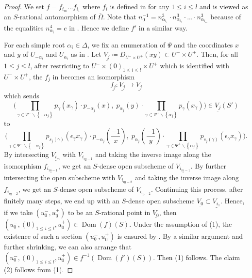 \documentclass[11pt, reqno]{amsart}
\theoremstyle{plain}
\theoremstyle{definition}
\DeclareMathOperator{\Dom}{Dom} %
\begin{document}
\begin{proof}
    We set
    $f=f_{i_m}...f_{i_1}$ where $f_i$ is defined in  for any $1\leq i\leq l$ and is viewed as an $S$-rational automorphism of $\overline{\Omega}$. 
    Note that $n_0^{-1}=n_{\alpha_{i_1}}^3\cdot n_{\alpha_{i_{2}}}^3\cdot...\cdot n_{\alpha_{i_m}}^3$ because of the equalities $n_{\alpha_i}^4=e$ in \cite[exposé~XX, théorème~3.1 (v)]{SGA3III}. Hence we define $f'$ in a similar way. 

    For each simple root $\alpha_i\in\Delta$, we fix an enumeration of $\Psi$ and the coordinates $x$ and $y$ of $U_{-\alpha_{i}}$ and $U_{\alpha_{i}}$ as in .
    Let $\underline{V_j}\coloneq D_{U^-\times U^+}(xy)\subset U^-\times U^+ $. Then, for all $1\leq j\leq l$, after restricting to $U^-\times (0)_{1\leq i\leq l}\times U^+$ which is identified with $U^-\times U^+$, the $f_j$ in  becomes
    an isomorphism
    \begin{equation}
    \underline{f_j}\colon \underline{V_j}\longrightarrow \underline{V_j}
    \end{equation}
which sends
$$\bigg(\prod_{\gamma\in \Psi^- \backslash\left\{-\alpha_j\right\}}p_\gamma(x_\gamma)\cdot p_{-\alpha_j}(x),\; p_{\alpha_j}(y)\cdot \prod_{\gamma\in \Psi^+ \backslash\left\{\alpha_j\right\}}p_\gamma(x_\gamma)\bigg)\in  \underline{V_j}(S')$$
to 
$$ \bigg(\prod_{\gamma\in \Psi^- \backslash\left\{-\alpha_j\right\}}p_{s_j(\gamma)}(\epsilon_\gamma x_\gamma)\cdot p_{-\alpha_j}\left(\frac{-1}{x}\right),\; p_{\alpha_j}\left(\frac{-1}{y}\right)\cdot \prod_{\gamma\in \Psi^+ \backslash\left\{\alpha_j\right\}}p_{s_j(\gamma)}(\epsilon_\gamma x_\gamma)\bigg).$$
By intersecting $\underline{V_{i_m}}$ with $\underline{V_{i_{m-1}}}$ and taking the inverse image along the isomorphism $\underline{f_{i_{m-1}}}$, we get an $S$-dense open subscheme of $\underline{V_{i_{m-1}}}$. By further intersecting the open subscheme with $\underline{V_{i_{m-2}}}$ and taking the inverse image along $\underline{f_{i_{m-2}}}$, we get an $S$-dense open subscheme of $\underline{V_{i_{m-2}}}$. Continuing this process, after finitely many steps, we end up with an $S$-dense open subscheme $\underline{V_0}\subset \underline{V_{i_1}}$.
Hence, if we take $(u_0^-,u_0^+)$ to be an $S$-rational point in $\underline{V_0}$, then $(u_0^-,(0)_{1\leq i\leq l},u_0^+)\in \Dom(f)(S)$. Under the assumption of (1), the existence of such a section $(u_0^-,u_0^+)$ is ensured by \cite[\S~2.3, Proposition~5]{BLR}. By a similar argument and further shrinking, we can also arrange that $(u_0^-,(0)_{1\leq i\leq l},u_0^+)\in f^{-1}(\Dom(f')(S))$. Then (1) follows. The claim (2) follows from  (1).
\end{proof}
\end{document}
